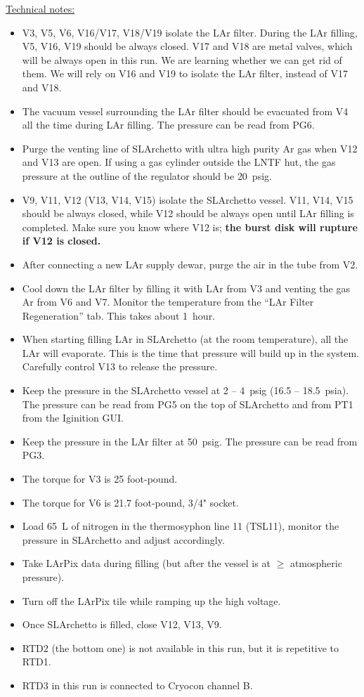 \documentclass[letterpaper,11pt]{article}
\begin{document}
\underline{Technical notes:}
\begin{itemize}
\setlength\itemsep{-0.2em}
\item V3, V5, V6, V16/V17, V18/V19 isolate the LAr filter.
During the LAr filling, V5, V16, V19 should be always closed.
V17 and V18 are metal valves, which will be always open in this run.  We are learning whether we can get rid of them.
We will rely on V16 and V19 to isolate the LAr filter, instead of V17 and V18.
\item The vacuum vessel surrounding the LAr filter should be evacuated from V4 all the time during LAr filling.  
The pressure can be read from PG6.
\item Purge the venting line of SLArchetto with ultra high purity Ar gas when V12 and V13 are open.
If using a gas cylinder outside the LNTF hut, the gas pressure at the outline of the regulator should be 
{\color{orange}20~psig}.
\item V9, V11, V12 (V13, V14, V15) isolate the SLArchetto vessel.  
V11, V14, V15 should be always closed, while V12 should be always open until LAr filling is completed.  
Make sure you know where V12 is; \textbf{the burst disk will rupture if V12 is closed.}
\item After connecting a new LAr supply dewar, purge the air in the tube from V2.
\item Cool down the LAr filter by filling it with LAr from V3 and venting the gas Ar from V6 and V7.  
Monitor the temperature from the ``LAr Filter Regeneration'' tab.  This takes about 1~hour.
\item When starting filling LAr in SLArchetto (at the room temperature), all the LAr will evaporate.  
This is the time that pressure will build up in the system.  
Carefully control V13 to release the pressure.
\item Keep the pressure in the SLArchetto vessel at 2 -- 4~psig (16.5 -- 18.5~psia).
The pressure can be read from PG5 on the top of SLArchetto and from PT1 from the Iginition GUI.
\item Keep the pressure in the LAr filter at 50~psig.
The pressure can be read from PG3.
\item The torque for V3 is 25 foot-pound.
\item The torque for V6 is 21.7 foot-pound, 3/4" socket.
\item Load 65~L of nitrogen in the thermosyphon line 11 (TSL11), 
monitor the pressure in SLArchetto and adjust accordingly.
\item Take LArPix data during filling (but after the vessel is at $\ge$ atmospheric pressure).
\item Turn off the LArPix tile while ramping up the high voltage.
\item Once SLArchetto is filled, close V12, V13, V9.
\item RTD2 (the bottom one) is not available in this run, but it is repetitive to RTD1.
\item RTD3 in this run is connected to Cryocon channel B.
\end{itemize}
\end{document}
